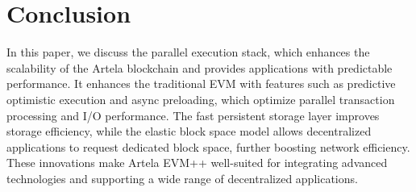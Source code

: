 \section{Conclusion}

In this paper, we discuss the parallel execution stack, which enhances the scalability of the Artela blockchain and provides applications with predictable performance. It enhances the traditional EVM with features such as predictive optimistic execution and async preloading, which optimize parallel transaction processing and I/O performance. The fast persistent storage layer improves storage efficiency, while the elastic block space model allows decentralized applications to request dedicated block space, further boosting network efficiency. These innovations make Artela EVM++ well-suited for integrating advanced technologies and supporting a wide range of decentralized applications.